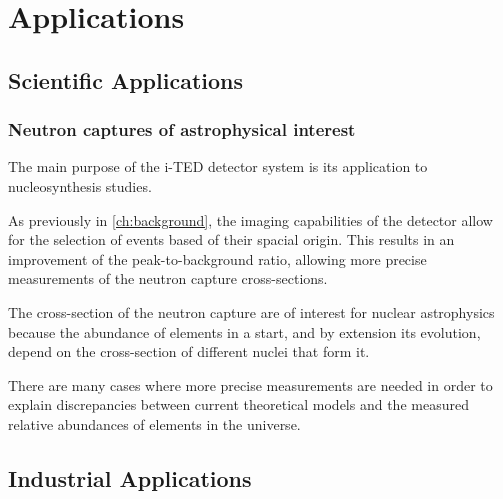 \chapter{Applications}\label{ch:applications}

\section{Scientific Applications}

\subsection{Neutron captures of astrophysical interest}

The main purpose of the \ac{i-TED} detector system is its application to nucleosynthesis studies.

As previously in \ref{ch:background}, the imaging capabilities of the detector allow for the selection of events based of their spacial origin. This results in an improvement of the peak-to-background ratio, allowing more precise measurements of the neutron capture cross-sections.

The cross-section of the neutron capture are of interest for nuclear astrophysics because the abundance of elements in a start, and by extension its evolution, depend on the cross-section of different nuclei that form it.

There are many cases where more precise measurements are needed in order to explain discrepancies between current theoretical models and the measured relative abundances of elements in the universe.

\section{Industrial Applications}

